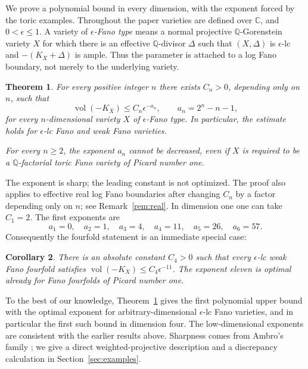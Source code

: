 \documentclass[11pt,reqno]{amsart}
\numberwithin{equation}{section}
\newtheorem{theorem}{Theorem}[section]
\newtheorem{corollary}[theorem]{Corollary}
\theoremstyle{definition}
\theoremstyle{remark}
\newcommand{\Q}{\mathbb Q}
\newcommand{\C}{\mathbb C}
\newcommand{\eps}{\epsilon}
\newcommand{\vol}{\operatorname{vol}}
\begin{document}
We prove a polynomial bound in every dimension, with the exponent forced by the toric examples. Throughout the paper varieties are defined over $\C$, and $0<\eps\le1$. A variety of \emph{$\eps$-Fano type} means a normal projective $\Q$-Gorenstein variety $X$ for which there is an effective $\Q$-divisor $\Delta$ such that $(X,\Delta)$ is $\eps$-lc and $-(K_X+\Delta)$ is ample. Thus the parameter is attached to a log Fano boundary, not merely to the underlying variety.

\begin{theorem}\label{thm:main}
For every positive integer $n$ there exists $C_n>0$, depending only on $n$, such that
\begin{equation}\label{eq:main}
 \vol(-K_X)\le C_n\eps^{-a_n},\qquad a_n=2^n-n-1,
\end{equation}
for every $n$-dimensional variety $X$ of $\eps$-Fano type. In particular, the estimate holds for $\eps$-lc Fano and weak Fano varieties.

For every $n\ge2$, the exponent $a_n$ cannot be decreased, even if $X$ is required to be a $\Q$-factorial toric Fano variety of Picard number one.
\end{theorem}

The exponent is sharp; the leading constant is not optimized. The proof also applies to effective real log Fano boundaries after changing $C_n$ by a factor depending only on $n$; see Remark~\ref{rem:real}. In dimension one one can take $C_1=2$. The first exponents are
\[
 a_1=0,\quad a_2=1,\quad a_3=4,\quad a_4=11,
 \quad a_5=26,\quad a_6=57.
\]
Consequently the fourfold statement is an immediate special case:
\begin{corollary}\label{cor:fourfold}
There is an absolute constant $C_4>0$ such that every $\eps$-lc weak Fano fourfold satisfies $\vol(-K_X)\le C_4\eps^{-11}$. The exponent eleven is optimal already for Fano fourfolds of Picard number one.
\end{corollary}

To the best of our knowledge, Theorem~\ref{thm:main} gives the first polynomial upper bound with the optimal exponent for arbitrary-dimensional $\eps$-lc Fano varieties, and in particular the first such bound in dimension four. The low-dimensional exponents are consistent with the earlier results above. Sharpness comes from Ambro's family \cite[Example~6.3]{Amb16}; we give a direct weighted-projective description and a discrepancy calculation in Section~\ref{sec:examples}.
\end{document}
